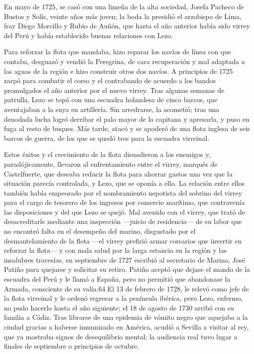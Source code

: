En mayo de 1725, se casó con una limeña de la alta sociedad, Josefa
Pacheco de Bustos y Solís, veinte años más joven; la boda la presidió
el arzobispo de Lima, fray Diego Morcillo y Rubio de Auñón, que hasta
el año anterior había sido virrey del Perú y había establecido buenas
relaciones con Lezo.

Para reforzar la flota que mandaba, hizo reparar los navíos de línea
con que contaba, desguazó y vendió la Peregrina, de cara recuperación
y mal adaptada a las aguas de la región e hizo construir otros dos
navíos. A principios de 1725 zarpó para combatir el corso y el
contrabando de acuerdo a los bandos promulgados el año anterior por el
nuevo virrey. Tras algunas semanas de patrulla, Lezo se topó con una
escuadra holandesa de cinco barcos, que aventajaban a la suya en
artillería. Sin arredrarse, la acometió; tras una denodada lucha
logró derribar el palo mayor de la capitana y apresarla, y puso en
fuga al resto de buques. Más tarde, atacó y se apoderó de una flota
inglesa de seis barcos de guerra, de los que se quedó tres para la
escuadra virreinal.

Estos éxitos y el crecimiento de la flota disuadieron a los enemigos
y, paradójicamente, llevaron al enfrentamiento entre el virrey,
marqués de Castelfuerte, que deseaba reducir la flota para ahorrar
gastos una vez que la situación parecía controlada, y Lezo, que se
oponía a ello. La relación entre ellos también había empeorado por el
nombramiento nepotista del sobrino del virrey para el cargo de
tesorero de los ingresos por comercio marítimo, que contravenía las
disposiciones y del que Lezo se quejó. Mal avenido con el virrey, que
trató de desacreditarle mediante una inspección ---juicio de
residencia--- de su labor que no encontró falta en el desempeño del
marino, disgustado por el desmantelamiento de la flota ---el virrey
prefirió armar corsarios que invertir en reforzar la flota--- y con
mala salud por la larga estancia en la región y las insalubres
travesías, en septiembre de 1727 escribió al secretario de Marina,
José Patiño para quejarse y solicitar su retiro. Patiño aceptó que
dejase el mando de la escuadra del Perú y le llamó a España, pero no
permitió que abandonase la Armada, consciente de su valía.64 El 13 de
febrero de 1728, le relevó como jefe de la flota virreinal y le ordenó
regresar a la península ibérica, pero Lezo, enfermo, no pudo hacerlo
hasta el año siguiente; el 18 de agosto de 1730 arribó con su familia
a Cádiz. Tras librarse de una epidemia de vómito negro que aquejaba a
la ciudad gracias a haberse inmunizado en América, acudió a Sevilla a
visitar al rey, que ya mostraba signos de desequilibrio mental; la
audiencia real tuvo lugar a finales de septiembre o principios de
octubre.

